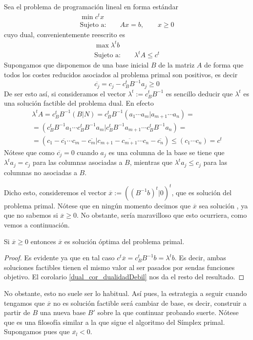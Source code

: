 Sea el problema de programación lineal en forma estándar
\begin{equation*}
\begin{array}{c}
\min c^tx\\
\text{Sujeto a:}\qquad Ax= b,\qquad x\geq 0
\end{array}
\end{equation*}
cuyo dual, convenientemente reescrito es
\begin{equation*}
\begin{array}{c}
\max \lambda^tb\\
\text{Sujeto a:}\qquad \lambda^tA\leq c^t
\end{array}
\end{equation*}
Supongamos que disponemos de una base inicial $B$ de la matriz $A$ de forma que todos los costes reducidos asociados al problema primal son positivos, es decir
\begin{equation*}
	\overline{c_j}=c_j-c_B^tB^{-1}a_j\geq 0
\end{equation*}
De ser esto así, si consideramos el vector $\lambda^t:=c_B^tB^{-1}$ es sencillo deducir que $\lambda^t$ es una solución factible del problema dual. En efecto
\begin{multline*}
	\lambda^tA=c_B^tB^{-1}(B|N)=c_B^tB^{-1}(a_1\cdots a_m|a_{m+1}\cdots a_n)=\\=(c_B^tB^{-1}a_1\cdots c_B^tB^{-1}a_m|c_B^tB^{-1}a_{m+1}\cdots c_B^tB^{-1}a_n)=\\=(c_1-\overline{c_1}\cdots c_m-\overline{c_m}|c_{m+1}-\overline{c_{m+1}}\cdots c_n-\overline{c_n})\leq (c_1\cdots c_n)=c^t
\end{multline*}
Nótese que como $\overline{c_j}=0$ cuando $a_j$ es una columna de la base se tiene que $\lambda^ta_j=c_j$ para las columnas asociadas a $B$, mientras que $\lambda^ta_j\leq c_j$ para las columnas no asociadas a $B$.

Dicho esto, consideremos el vector $\overline{x}:=((B^{-1}b)^t|0)^t$, que es solución del problema primal. Nótese que en ningún momento decimos que $\overline{x}$ sea solución , ya que no sabemos si $\overline{x}\geq 0$. No obstante, sería maravilloso que esto ocurriera, como vemos a continuación.
\begin{lem}
	\label{dual_lem_testOptim}
	Si $\overline{x}\geq 0$ entonces $\overline{x}$ es solución óptima del problema primal.
\end{lem}
\begin{proof}
	Es evidente ya que en tal caso $c^t\overline{x}=c_B^tB^{-1}b=\lambda^tb$. Es decir, ambas soluciones factibles tienen el mismo valor al ser pasados por sendas funciones objetivo. El corolario \ref{dual_cor_dualidadDebil} nos da el resto del resultado.
\end{proof}
No obstante, esto no suele ser lo habitual. Así pues, la estrategia a seguir cuando tengamos que $\overline{x}$ no es solución factible será cambiar de base, es decir, construir a partir de $B$ una nueva base $B'$ sobre la que continuar probando suerte. Nótese que es una filosofía similar a la que sigue el algoritmo del Símplex primal. Supongamos pues que $\overline{x_l}<0$.

